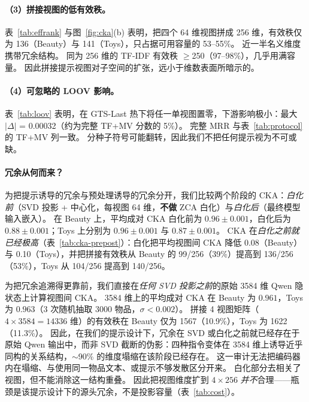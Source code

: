 \documentclass[sigconf,natbib=true,anonymous]{acmart}
\newcommand{\tfmv}{\textsc{TF+MV}\xspace}
\begin{document}
\paragraph{（3）拼接视图的低有效秩。}
表~\ref{tab:effrank} 与图~\ref{fig:cka}(b) 表明，把四个 64 维视图拼成 256 维，有效秩仅为 136（Beauty）与 141（Toys），只占据可用容量的 53--55\%。
近一半名义维度携带冗余结构。
同为 256 维的 TF-IDF 有效秩 $\ge$250（97--98\%），几乎用满容量。
因此拼接提示视图对子空间的扩张，远小于维数表面所暗示的。

\paragraph{（4）可忽略的 LOOV 影响。}
表~\ref{tab:loov} 表明，在 GTS-Last 热下将任一单视图置零，下游影响极小：最大 $|\Delta|$ = 0.00032（约为完整 \tfmv 分数的 5\%）。
完整 MRR 与表~\ref{tab:protocol} 的 \tfmv 列一致。
分种子符号可能翻转，因此我们不把任何提示视为不可或缺。

\paragraph{冗余从何而来？}
为把提示诱导的冗余与预处理诱导的冗余分开，我们比较两个阶段的 CKA：\emph{白化前}（SVD 投影 + 中心化，每视图 64 维，\textbf{不做} ZCA 白化）与\emph{白化后}（最终模型输入嵌入）。
在 Beauty 上，平均成对 CKA 白化前为 $0.96\pm0.001$，白化后为 $0.88\pm0.001$；Toys 上分别为 $0.96\pm0.001$ 与 $0.87\pm0.001$。
CKA 在\emph{白化之前就已经极高}（表~\ref{tab:cka-prepost}）：白化把平均视图间 CKA 降低 0.08（Beauty）与 0.10（Toys），并把拼接有效秩从 Beauty 的 99/256（39\%）提高到 136/256（53\%），Toys 从 104/256 提高到 140/256。

为把冗余追溯得更靠前，我们直接在\emph{任何 SVD 投影之前}的原始 3584 维 Qwen 隐状态上计算视图间 CKA。
3584 维上的平均成对 CKA 在 Beauty 为 $0.961$，Toys 为 $0.963$（3 次随机抽取 3000 物品，$\sigma < 0.002$）。
拼接 4 视图矩阵（$4\times 3584 = 14336$ 维）的有效秩在 Beauty 仅为 1567（10.9\%），Toys 为 1622（11.3\%）。
因此，在我们的提示设计下，冗余在 SVD 或白化之前就已经存在于原始 Qwen 输出中，而非 SVD 截断的伪影：四种指令变体在 3584 维上诱导近乎同构的关系结构，$\sim$90\% 的维度塌缩在该阶段已经存在。
这一审计无法把编码器内在塌缩、与使用同一物品文本、或提示不够发散区分开来。
白化部分去相关了视图，但不能消除这一结构重叠。
因此把视图维度扩到 $4\times256$ \emph{并不}合理——瓶颈是该提示设计下的源头冗余，不是投影容量（表~\ref{tab:cost}）。
\end{document}
